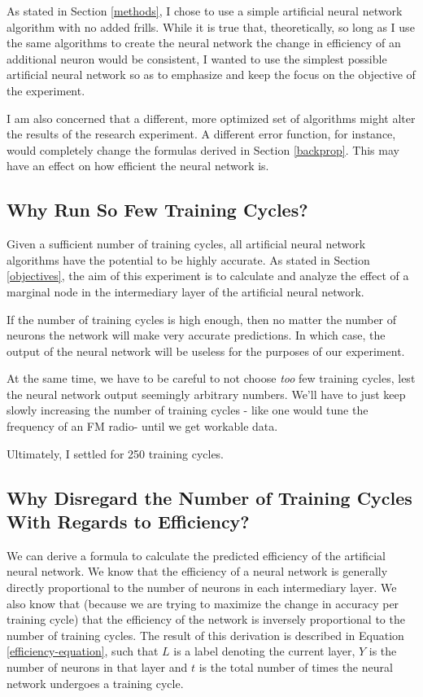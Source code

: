 \documentclass[12pt]{article}
\begin{document}
As stated in Section \ref{methods}, I chose to use a simple artificial neural network algorithm with no added frills. While it is true that, theoretically, so long as I use the same algorithms to create the neural network the change in efficiency of an additional neuron would be consistent, I wanted to use the simplest possible artificial neural network so as to emphasize and keep the focus on the objective of the experiment.

I am also concerned that a different, more optimized set of algorithms might alter the results of the research experiment. A different error function, for instance, would completely change the formulas derived in Section \ref{backprop}. This may have an effect on how efficient the neural network is.

\subsection{Why Run So Few Training Cycles?}

Given a sufficient number of training cycles, all artificial neural network algorithms have the potential to be highly accurate. As stated in Section \ref{objectives}, the aim of this experiment is to calculate and analyze the effect of a marginal node in the intermediary layer of the artificial neural network.

If the number of training cycles is high enough, then no matter the number of neurons the network will make very accurate predictions. In which case, the output of the neural network will be useless for the purposes of our experiment.

At the same time, we have to be careful to not choose \textit{too} few training cycles, lest the neural network output seemingly arbitrary numbers. We'll have to just keep slowly increasing the number of training cycles - like one would tune the frequency of an FM radio- until we get workable data.

Ultimately, I settled for 250 training cycles.

\subsection{Why Disregard the Number of Training Cycles With Regards to Efficiency?}


We can derive a formula to calculate the predicted efficiency of the artificial neural network. We know that the efficiency of a neural network is generally directly proportional to the number of neurons in each intermediary layer. We also know that (because we are trying to maximize the change in accuracy per training cycle) that the efficiency of the network is inversely proportional to the number of training cycles. The result of this derivation is described in Equation \ref{efficiency-equation}, such that $L$ is a label denoting the current layer, $Y$ is the number of neurons in that layer and $t$ is the total number of times the neural network undergoes a training cycle.
\end{document}
